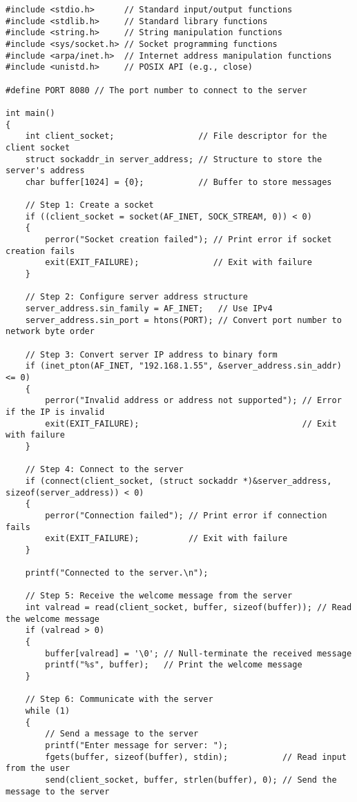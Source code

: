\documentclass[a4paper,12pt]{article}
\begin{document}
\begin{lstlisting}[caption={Distributed System Client Code}, label={lst:distributed-client}]
#include <stdio.h>      // Standard input/output functions
#include <stdlib.h>     // Standard library functions
#include <string.h>     // String manipulation functions
#include <sys/socket.h> // Socket programming functions
#include <arpa/inet.h>  // Internet address manipulation functions
#include <unistd.h>     // POSIX API (e.g., close)

#define PORT 8080 // The port number to connect to the server

int main()
{
    int client_socket;                 // File descriptor for the client socket
    struct sockaddr_in server_address; // Structure to store the server's address
    char buffer[1024] = {0};           // Buffer to store messages

    // Step 1: Create a socket
    if ((client_socket = socket(AF_INET, SOCK_STREAM, 0)) < 0)
    {
        perror("Socket creation failed"); // Print error if socket creation fails
        exit(EXIT_FAILURE);               // Exit with failure
    }

    // Step 2: Configure server address structure
    server_address.sin_family = AF_INET;   // Use IPv4
    server_address.sin_port = htons(PORT); // Convert port number to network byte order

    // Step 3: Convert server IP address to binary form
    if (inet_pton(AF_INET, "192.168.1.55", &server_address.sin_addr) <= 0)
    {
        perror("Invalid address or address not supported"); // Error if the IP is invalid
        exit(EXIT_FAILURE);                                 // Exit with failure
    }

    // Step 4: Connect to the server
    if (connect(client_socket, (struct sockaddr *)&server_address, sizeof(server_address)) < 0)
    {
        perror("Connection failed"); // Print error if connection fails
        exit(EXIT_FAILURE);          // Exit with failure
    }

    printf("Connected to the server.\n");

    // Step 5: Receive the welcome message from the server
    int valread = read(client_socket, buffer, sizeof(buffer)); // Read the welcome message
    if (valread > 0)
    {
        buffer[valread] = '\0'; // Null-terminate the received message
        printf("%s", buffer);   // Print the welcome message
    }

    // Step 6: Communicate with the server
    while (1)
    {
        // Send a message to the server
        printf("Enter message for server: ");
        fgets(buffer, sizeof(buffer), stdin);           // Read input from the user
        send(client_socket, buffer, strlen(buffer), 0); // Send the message to the server


\end{lstlisting}
\end{document}
